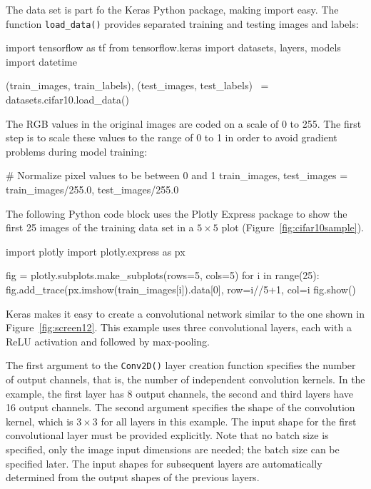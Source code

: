 The data set is part fo the Keras Python package, making import easy. The function \texttt{load\_data()} provides separated training and testing images and labels:

\begin{pythoncode}
import tensorflow as tf
from tensorflow.keras import datasets, layers, models
import datetime

(train_images, train_labels), (test_images, test_labels) \
    = datasets.cifar10.load_data()
\end{pythoncode}

The RGB values in the original images are coded on a scale of 0 to 255. The first step is to scale these values to the range of 0 to 1 in order to avoid gradient problems during model training:

\begin{pythoncode}
# Normalize pixel values to be between 0 and 1
train_images, test_images = train_images/255.0, test_images/255.0
\end{pythoncode}

The following Python code block uses the Plotly Express package to show the first 25 images of the training data set in a $5\times 5$ plot (Figure~\ref{fig:cifar10sample}).

\begin{pythoncode}
import plotly
import plotly.express as px

fig = plotly.subplots.make_subplots(rows=5, cols=5)
for i in range(25):
    fig.add_trace(px.imshow(train_images[i]).data[0], 
                            row=i//5+1, col=i%
fig.show()
\end{pythoncode}

Keras makes it easy to create a convolutional network similar to the one shown in Figure~\ref{fig:screen12}. This example uses three convolutional layers, each with a ReLU activation and followed by max-pooling. 

The first argument to the \texttt{Conv2D()} layer creation function specifies the number of output channels, that is, the number of independent convolution kernels. In the example, the first layer has 8 output channels, the second and third layers have 16 output channels. The second argument specifies the shape of the convolution kernel, which is $3 \times 3$ for all layers in this example. The input shape for the first convolutional layer must be provided explicitly. Note that no batch size is specified, only the image input dimensions are needed; the batch size can be specified later. The input shapes for subsequent layers are automatically determined from the output shapes of the previous layers.

